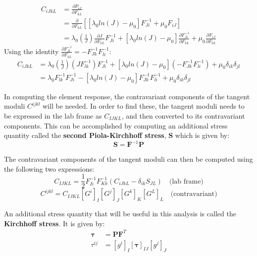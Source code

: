 \documentclass[]{spie}  %
\begin{document}
\begin{align}
C_{iJkL} 	&= \frac{\partial P_{iJ}}{\partial F_{kL}} \\
&= \frac{\partial}{\partial F_{kL}} \left[\left[\lambda_0 ln(J) - \mu_0 \right]F^{-1}_{Ji} + \mu_0 F_{iJ}\right] \\
&= \lambda_0 \left(\frac{1}{J}\right) \frac{\partial J}{\partial F_{kL}} F^{-1}_{Ji} + \left[\lambda_0 ln(J) - \mu_0 \right] \frac{\partial F^{-1}_{Ji}}{\partial F_{kL}} + \mu_0 \frac{\partial F_{iJ}}{\partial F_{kL}}
\end{align}
Using the identity $\frac{\partial F^{-1}_{Ji}}{\partial F_{kL}} = -F^{-1}_{Jk} F^{-1}_{li}$:
\begin{align}
C_{iJkL}	&= \lambda_0 \left(\frac{1}{J}\right) (J F^{-1}_{lk}) F^{-1}_{Ji} + \left[\lambda_0 ln(J) - \mu_0 \right]\left(-F^{-1}_{Jk} F^{-1}_{li}\right) + \mu_0 \delta_{ik}\delta_{jl} \\
&= \lambda_0  F^{-1}_{lk} F^{-1}_{Ji} - \left[\lambda_0 ln(J) - \mu_0 \right] F^{-1}_{Jk} F^{-1}_{li} + \mu_0 \delta_{ik}\delta_{jl}
\end{align}

In computing the element response, the contravariant components of the tangent moduli $C^{ijkl}$ will be needed. In order to find these, the tangent moduli needs to be expressed in the lab frame as $C_{IJKL}$, and then converted to its contravariant components. This can be accomplished by computing an additional stress quantity called the \textbf{second Piola-Kirchhoff stress}, $\bm{S}$ which is given by:
\begin{equation}
\label{eq: second piola kirchhoff stress}
\bm{S} = \bm{F}^{-1} \bm{P}
\end{equation}

The contravariant components of the tangent moduli can then be computed using the following two expressions:
\begin{equation}
\label{eq: tangent moduli lab}
C_{IJKL} = \frac{1}{2} F^{-1}_{Ii}F^{-1}_{Kk} \left(C_{iJkL} - \delta_{ik} S_{JL}\right) \quad \textrm{(lab frame)}
\end{equation}
\begin{equation}
\label{eq: tangent moduli contravariant}
C^{ijkl} = C_{IJKL} \left[G^i\right]_I \left[G^j\right]_J \left[G^k\right]_K \left[G^L\right]_L \quad \textrm{(contravariant)}
\end{equation}

An additional stress quantity that will be useful in this analysis is called the \textbf{Kirchhoff stress}. It is given by:
\begin{align}
\label{eq: Kirchhoff stress}
\bm{\tau} &= \bm{P} \bm{F}^T \\
\label{eq: Kirchhoff stress contravariant}
\tau^{ij} &= \left[g^i\right]_I \left[\bm{\tau}\right]_{IJ} \left[g^j\right]_J
\end{align}
\end{document}
